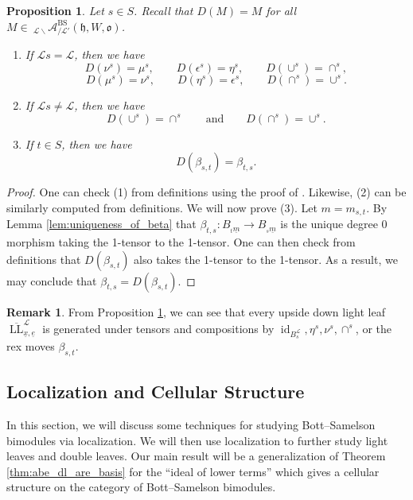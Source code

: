 \documentclass{amsart}
\newcommand{\scrL}{\mathcal{L}}
\DeclareMathOperator{\id}{id}
\newcommand{\fr}[1]{\mathfrak{#1}}
\DeclareMathOperator{\BS}{BS}
\DeclareMathOperator{\LL}{LL}
\newcommand{\Amon}[2]{\:_{#1 \backslash} \mathcal{A}_{/ #2} }
\newcommand{\ue}{\underline{e}}
\newcommand{\ux}{\underline{x}}
\newtheorem{proposition}[subsubsection]{Proposition}
\theoremstyle{definition}
\newtheorem{remark}[subsubsection]{Remark}
\numberwithin{equation}{subsection}
\begin{document}
\begin{proposition}\label{prop:duality_and_str_mors}
     Let $s \in S$. Recall that $D(M) = M$ for all $M \in \Amon{\scrL}{\scrL'}^{\BS} (\fr{h}, W, \fr{o})$.
     \begin{enumerate}
         \item If $\scrL s = \scrL$, then we have
         \[D (\nu^s) = \mu^s, \qquad D(\epsilon^s) = \eta^s, \qquad D(\cup^s) = \cap^s,\]
         \[D (\mu^s) = \nu^s, \qquad D(\eta^s) = \epsilon^s, \qquad D(\cap^s) = \cup^s.\]
         \item If $\scrL s \neq \scrL$, then we have
         \[D(\cup^s) = \cap^s \qquad \text{and} \qquad D(\cap^s) = \cup^s.\]
         \item If $t \in S$, then we have
         \[D (\beta_{s,t}) = \beta_{t,s}.\]
     \end{enumerate}
\end{proposition}
\begin{proof}
    One can check (1) from definitions using the proof of \cite[Lemma 2.20]{Abe19}. Likewise, (2) can be similarly computed from definitions.
    We will now prove (3). Let $m = m_{s,t}$. By Lemma \ref{lem:uniqueness_of_beta} that $\beta_{t,s} : B_{{}_t \underline{m}} \to B_{{}_s \underline{m}}$ is the unique degree 0 morphism taking the 1-tensor to the 1-tensor.
    One can then check from definitions that $D (\beta_{s,t})$ also takes the 1-tensor to the 1-tensor. As a result, we may conclude that $\beta_{t,s} = D(\beta_{s,t})$.
\end{proof}
\begin{remark}\label{rem:upside_down_LL}
    From Proposition \ref{prop:duality_and_str_mors}, we can see that every upside down light leaf $\overline{\LL}_{\ux, \ue}^{\scrL}$ is generated under tensors and compositions by $\id_{B_s^{\scrL}}, \eta^s, \nu^s, \cap^s$, or the rex moves $\beta_{s,t}$.
\end{remark}
\subsection{Localization and Cellular Structure}

In this section, we will discuss some techniques for studying Bott--Samelson bimodules via localization.
We will then use localization to further study light leaves and double leaves. Our main result will be a generalization of Theorem \ref{thm:abe_dl_are_basis} for the ``ideal of lower terms'' which gives a cellular structure on the category of Bott--Samelson bimodules.
\end{document}
